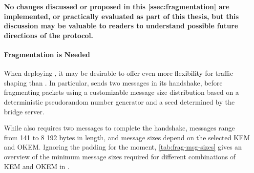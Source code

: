 \textbf{No changes discussed or proposed in this \cref{ssec:fragmentation} are implemented, or practically evaluated as part of this thesis, but this discussion may be valuable to readers to understand possible future directions of the protocol.}

\paragraph{Fragmentation is Needed}
When deploying \drivel{}, it may be desirable to offer even more flexibility for traffic shaping than \obfsfour{}. In particular, \obfsfour{} sends two messages in its handshake, before fragmenting packets using a customizable message size distribution based on a deterministic pseudorandom number generator and a seed determined by the bridge server.

While \drivel{} also requires two messages to complete the handshake, \obfsfour{} messages range from 141 to 8 192 bytes in length, and \drivel{} message sizes depend on the selected KEM and OKEM. Ignoring the padding for the moment, \cref{tab:frag-msg-sizes} gives an overview of the minimum message sizes required for different combinations of KEM and OKEM in \drivel{}.

